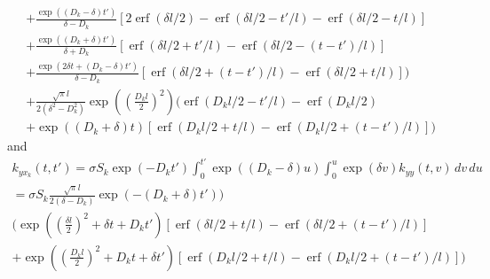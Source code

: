 \documentclass[a4paper]{article}
\newcommand{\erf}{\operatorname{erf}}
\begin{document}
\begin{multline}
  +
  \frac{\exp((D_k - \delta)t')}{\delta - D_k}
  [2\erf(\delta l / 2) - \erf(\delta l / 2 - t'/l) - \erf(\delta l / 2 - t/l)] \\
  +
  \frac{\exp((D_k + \delta)t')}{\delta + D_k}
  [\erf(\delta l / 2 + t'/l) - \erf(\delta l / 2 - (t-t')/l)]\\
  +
  \frac{\exp(2\delta t + (D_k - \delta)t')}{\delta - D_k}
  [\erf(\delta l / 2 + (t-t')/l) - \erf(\delta l / 2 + t/l)]
  \bigg) \\
  + \frac{\sqrt{\pi}l}{2(\delta^2 - D_k^2)}
  \exp\left(\left(\frac{D_k l}{2}\right)^2\right)
  \bigg(
  \erf(D_k l/2 - t'/l) - \erf(D_k l/2) \\
  + \exp((D_k + \delta) t) [\erf(D_k l/2 + t/l) - \erf(D_k l/2 + (t-t')/l)]
  \bigg)
\end{multline}
and
\begin{multline}
  k_{y x_k}(t, t') = \sigma S_k \exp(-D_k t') \int_0^{t'}
  \exp((D_k - \delta) u) \int_0^u \exp(\delta v) k_{yy}(t, v)\, dv\, du \\
  = \sigma S_k \frac{\sqrt{\pi} l}{2(\delta - D_k)} \exp(-(D_k+\delta) t')) \\
  \bigg(
  \exp\left(\left(\frac{\delta l}{2}\right)^2 + \delta t + D_k t'\right)
  [\erf(\delta l / 2 + t/l) - \erf(\delta l / 2 + (t-t')/l)] \\
  +
  \exp\left(\left(\frac{D_k l}{2}\right)^2 + D_k t + \delta t' \right)
  [\erf(D_k l / 2 + t/l) - \erf(D_k l / 2 + (t-t')/l)]
  \bigg)
\end{multline}
\end{document}
